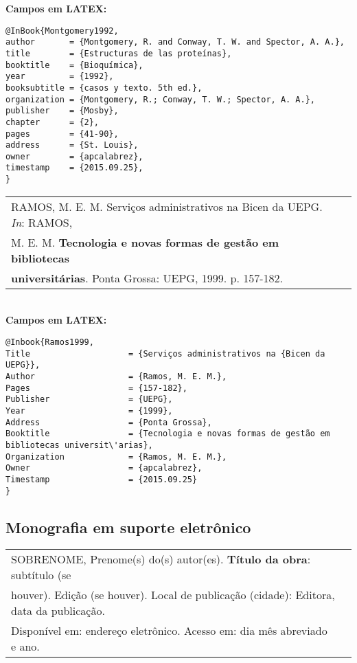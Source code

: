 \textbf{Campos em LATEX:} 

\begin{verbatim}
@InBook{Montgomery1992,
author       = {Montgomery, R. and Conway, T. W. and Spector, A. A.},
title        = {Estructuras de las proteínas},
booktitle    = {Bioquímica},
year         = {1992},
booksubtitle = {casos y texto. 5th ed.},
organization = {Montgomery, R.; Conway, T. W.; Spector, A. A.},
publisher    = {Mosby},
chapter      = {2},
pages        = {41-90},
address      = {St. Louis},
owner        = {apcalabrez},
timestamp    = {2015.09.25},
}
\end{verbatim}

\begin{tabular}{|l|c|} \hline
	RAMOS, M. E. M. Serviços administrativos na Bicen da UEPG. \textit{In}:
	RAMOS, \\
	M. E. M. \textbf{Tecnologia e novas formas de gestão em bibliotecas} \\
		\textbf{universit\'arias}. Ponta Grossa: UEPG, 1999. p. 157-182.   \\\hline
\end{tabular} \\ 

\textbf{Campos em LATEX:} 

\begin{verbatim}
@Inbook{Ramos1999,
Title                    = {Serviços administrativos na {Bicen da UEPG}},
Author                   = {Ramos, M. E. M.},
Pages                    = {157-182},
Publisher                = {UEPG},
Year                     = {1999},
Address                  = {Ponta Grossa},
Booktitle                = {Tecnologia e novas formas de gestão em 
bibliotecas universit\'arias},
Organization             = {Ramos, M. E. M.}, 
Owner                    = {apcalabrez},
Timestamp                = {2015.09.25}
}
\end{verbatim}

\subsection{Monografia em suporte eletrônico}	 

\begin{tabular}{|l|c|} \hline
	SOBRENOME, Prenome(s) do(s) autor(es). \textbf{Título da obra}: 
	subtítulo (se \\ houver). Edição (se houver). Local de publicação (cidade): Editora, data da publicação. \\ Disponível em: endereço eletrônico. Acesso em: dia m\^es abreviado e ano.     \\\hline
\end{tabular} \\

